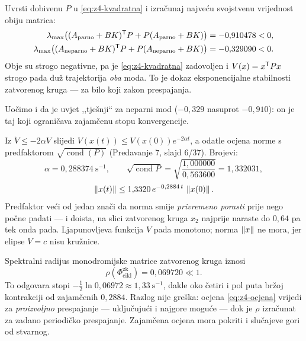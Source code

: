 \begin{korak}
Uvrsti dobivenu $P$ u \eqref{eq:z4-kvadratna} i izračunaj najveću svojstvenu
vrijednost obiju matrica:
\begin{align}
\lambda_{\max}\bigl((A_{\mathrm{parno}} + BK)^{\mathsf{T}} P + P(A_{\mathrm{parno}} + BK)\bigr) &= -0{,}910478 < 0, \\
\lambda_{\max}\bigl((A_{\mathrm{neparno}} + BK)^{\mathsf{T}} P + P(A_{\mathrm{neparno}} + BK)\bigr) &= -0{,}329090 < 0 .
\end{align}
Obje su strogo negativne, pa je \eqref{eq:z4-kvadratna} zadovoljen i
$V(x) = x^{\mathsf{T}} P x$ strogo pada duž trajektorija \emph{oba} moda. To je dokaz
eksponencijalne stabilnosti zatvorenog kruga --- za bilo koji zakon prespajanja.

Uočimo i da je uvjet ,,tješnji`` za neparni mod ($-0{,}329$ nasuprot $-0{,}910$):
on je taj koji ograničava zajamčenu stopu konvergencije.
\end{korak}

\begin{korak}
Iz $\dot{V} \leq -2\alpha V$ slijedi $V(x(t)) \leq V(x(0))e^{-2\alpha t}$, a
odatle ocjena norme s predfaktorom $\sqrt{\operatorname{cond}(P)}$ (Predavanje 7,
slajd 6/37). Brojevi:
\begin{equation}
\alpha = 0{,}288374\ \mathrm{s}^{-1},
\qquad
\sqrt{\operatorname{cond} P} = \sqrt{\frac{1{,}000000}{0{,}563600}} = 1{,}332031,
\end{equation}
\begin{equation}
\left\lVert x(t) \right\rVert \leq 1{,}3320\, e^{-0{,}2884\,t}\,\left\lVert x(0) \right\rVert .
\label{eq:z4-ocjena}
\end{equation}
Predfaktor veći od jedan znači da norma smije \emph{privremeno porasti} prije
nego počne padati --- i doista, na slici zatvorenog kruga $x_2$ najprije naraste
do $0{,}64$ pa tek onda pada. Ljapunovljeva funkcija $V$ pada monotono; norma
$\left\lVert x \right\rVert$ ne mora, jer elipse $V = c$ nisu kružnice.
\end{korak}

\begin{korak}
Spektralni radijus monodromijske matrice zatvorenog kruga iznosi
\begin{equation}
\rho(\Phi_{\mathrm{cikl}}^{\mathrm{zk}}) = 0{,}069720 \ll 1 .
\end{equation}
To odgovara stopi $-\tfrac12\ln 0{,}06972 \approx 1{,}33\ \mathrm{s}^{-1}$, dakle
oko četiri i pol puta bržoj kontrakciji od zajamčenih $0{,}2884$. Razlog nije
greška: ocjena \eqref{eq:z4-ocjena} vrijedi za \emph{proizvoljno} prespajanje ---
uključujući i najgore moguće --- dok je $\rho$ izračunat za zadano periodičko
prespajanje. Zajamčena ocjena mora pokriti i slučajeve gori od stvarnog.
\end{korak}

